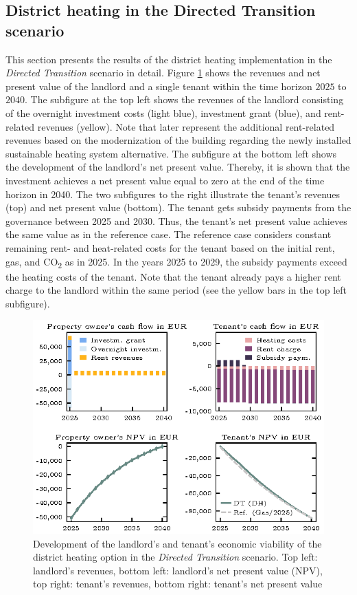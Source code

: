 \subsection{District heating in the Directed Transition scenario}\label{res:district_heating}
This section presents the results of the district heating implementation in the \textit{Directed Transition} scenario in detail. Figure \ref{fig:dt+dh} shows the revenues and net present value of the landlord and a single tenant within the time horizon $2025$ to $2040$. The subfigure at the top left shows the revenues of the landlord consisting of the overnight investment costs (light blue), investment grant (blue), and rent-related revenues (yellow). Note that later represent the additional rent-related revenues based on the modernization of the building regarding the newly installed sustainable heating system alternative. The subfigure at the bottom left shows the development of the landlord's net present value. Thereby, it is shown that the investment achieves a net present value equal to zero at the end of the time horizon in 2040. The two subfigures to the right illustrate the tenant's revenues (top) and net present value (bottom). The tenant gets subsidy payments from the governance between 2025 and 2030. Thus, the tenant's net present value achieves the same value as in the reference case. The reference case considers constant remaining rent- and heat-related costs for the tenant based on the initial rent, gas, and CO\textsubscript{2} as in 2025. In the years 2025 to 2029, the subsidy payments exceed the heating costs of the tenant. Note that the tenant already pays a higher rent charge to the landlord within the same period (see the yellow bars in the top left subfigure).

\begin{figure}[h]
	\centering
	\includegraphics[width=1\linewidth]{figures/4_Results/fig_DT_DH/detail.eps}
	\caption{Development of the landlord's and tenant's economic viability of the district heating option in the \textit{Directed Transition} scenario. Top left: landlord's revenues, bottom left: landlord's net present value (NPV), top right: tenant's revenues, bottom right: tenant's net present value}
	\label{fig:dt+dh}
\end{figure}

